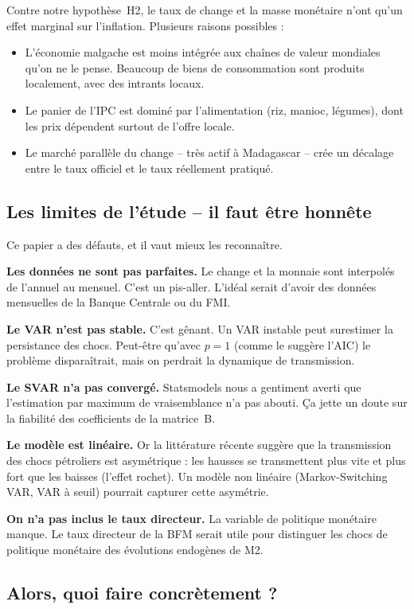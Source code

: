 \documentclass[12pt,a4paper]{article}
\begin{document}
Contre notre hypothèse~H2, le taux de change et la masse monétaire n'ont qu'un effet marginal sur l'inflation. Plusieurs raisons possibles :
\begin{itemize}
  \item L'économie malgache est moins intégrée aux chaînes de valeur mondiales qu'on ne le pense. Beaucoup de biens de consommation sont produits localement, avec des intrants locaux.
  \item Le panier de l'IPC est dominé par l'alimentation (riz, manioc, légumes), dont les prix dépendent surtout de l'offre locale.
  \item Le marché parallèle du change -- très actif à Madagascar -- crée un décalage entre le taux officiel et le taux réellement pratiqué.
\end{itemize}

\subsection{Les limites de l'étude -- il faut être honnête}

Ce papier a des défauts, et il vaut mieux les reconnaître.

\textbf{Les données ne sont pas parfaites.} Le change et la monnaie sont interpolés de l'annuel au mensuel. C'est un pis-aller. L'idéal serait d'avoir des données mensuelles de la Banque Centrale ou du FMI.

\textbf{Le VAR n'est pas stable.} C'est gênant. Un VAR instable peut surestimer la persistance des chocs. Peut-être qu'avec $p=1$ (comme le suggère l'AIC) le problème disparaîtrait, mais on perdrait la dynamique de transmission.

\textbf{Le SVAR n'a pas convergé.} Statsmodels nous a gentiment averti que l'estimation par maximum de vraisemblance n'a pas abouti. Ça jette un doute sur la fiabilité des coefficients de la matrice~B.

\textbf{Le modèle est linéaire.} Or la littérature récente suggère que la transmission des chocs pétroliers est asymétrique : les hausses se transmettent plus vite et plus fort que les baisses (l'effet rochet). Un modèle non linéaire (Markov-Switching VAR, VAR à seuil) pourrait capturer cette asymétrie.

\textbf{On n'a pas inclus le taux directeur.} La variable de politique monétaire manque. Le taux directeur de la BFM serait utile pour distinguer les chocs de politique monétaire des évolutions endogènes de M2.

\subsection{Alors, quoi faire concrètement ?}
\end{document}
